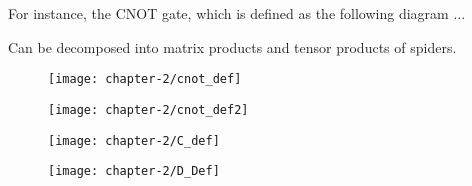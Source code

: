 For instance, the CNOT gate, which is defined as the following diagram
...

Can be decomposed into matrix products and tensor products of spiders.
\begin{figure}[H]
    \centering
    \texttt{[image: chapter-2/cnot\_def]}
\end{figure}

\begin{figure}[H]
    \centering
\end{figure}

\begin{figure}[H]
    \centering
\end{figure}

\begin{figure}[H]
    \centering
    \texttt{[image: chapter-2/cnot\_def2]}
\end{figure}

\begin{figure}[H]
\centering
\begin{minipage}{.4\textwidth}
    \centering
    \texttt{[image: chapter-2/C\_def]}
\end{minipage}%
\begin{minipage}{.4\textwidth}
    \centering
    \texttt{[image: chapter-2/D\_Def]}
\end{minipage}
\end{figure}

